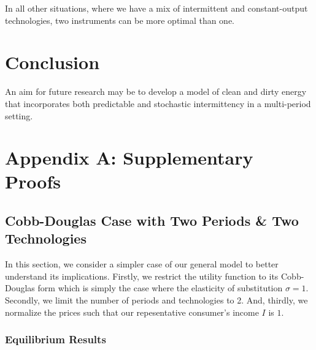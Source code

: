 \documentclass[11pt,a4paper]{extarticle}
\begin{document}
In all other situations, where we have a mix of intermittent and constant-output technologies, two instruments can be more optimal than one.







\pagebreak

\section{Conclusion}

An aim for future research may be to develop a model of clean and dirty energy that incorporates both predictable and stochastic intermittency in a multi-period setting. 



\pagebreak

\section{Appendix A: Supplementary Proofs}

\subsection{Cobb-Douglas Case with Two Periods \& Two Technologies}

In this section, we consider a simpler case of our general model to better understand its implications. Firstly, we restrict the utility function to its Cobb-Douglas form which is simply the case where the elasticity of substitution $\sigma = 1$. Secondly, we limit the number of periods and technologies to 2. And, thirdly, we normalize the prices such that our repesentative consumer's income $I$ is $1$.

\subsubsection{Equilibrium Results}
\end{document}
